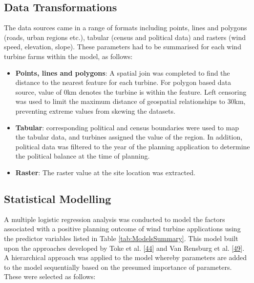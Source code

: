 \documentclass[a4paper,]{article}
\providecommand{\tightlist}{%
  \setlength{\itemsep}{0pt}\setlength{\parskip}{0pt}}
\theoremstyle{definition}
\theoremstyle{definition}
\theoremstyle{definition}
\theoremstyle{remark}
\begin{document}
\subsection{Data Transformations}\label{data-transformations}

The data sources came in a range of formats including points, lines and
polygons (roads, urban regions etc.), tabular (census and political
data) and rasters (wind speed, elevation, slope). These parameters had
to be summarised for each wind turbine farms within the model, as
follows:

\begin{itemize}
\tightlist
\item
  \textbf{Points, lines and polygons}: A spatial join was completed to
  find the distance to the nearest feature for each turbine. For polygon
  based data source, value of 0km denotes the turbine is within the
  feature. Left censoring was used to limit the maximum distance of
  geospatial relationships to 30km, preventing extreme values from
  skewing the datasets.
\item
  \textbf{Tabular}: corresponding political and census boundaries were
  used to map the tabular data, and turbines assigned the value of the
  region. In addition, political data was filtered to the year of the
  planning application to determine the political balance at the time of
  planning.
\item
  \textbf{Raster}: The raster value at the site location was extracted.
\end{itemize}

\subsection{Statistical Modelling}\label{statistical-modelling}

A multiple logistic regression analysis was conducted to model the
factors associated with a positive planning outcome of wind turbine
applications using the predictor variables listed in Table
\ref{tab:ModelsSummary}. This model built upon the approaches developed
by Toke et al. {[}\protect\hyperlink{ref-Toke2005}{44}{]} and Van
Rensburg et al. {[}\protect\hyperlink{ref-VanRensburg20}{49}{]}. A
hierarchical approach was applied to the model whereby parameters are
added to the model sequentially based on the presumed importance of
parameters. These were selected as follows:
\end{document}
